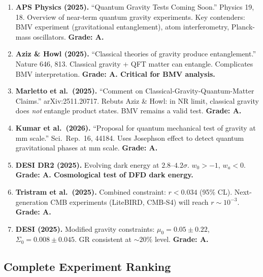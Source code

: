 \documentclass[11pt,a4paper]{article}
\begin{document}
\begin{enumerate}
\item \textbf{APS Physics (2025).} ``Quantum Gravity Tests Coming Soon.'' Physics 19, 18. Overview of near-term quantum gravity experiments. Key contenders: BMV experiment (gravitational entanglement), atom interferometry, Planck-mass oscillators. \textbf{Grade: A.}

\item \textbf{Aziz \& Howl (2025).} ``Classical theories of gravity produce entanglement.'' Nature 646, 813. Classical gravity + QFT matter can entangle. Complicates BMV interpretation. \textbf{Grade: A. Critical for BMV analysis.}

\item \textbf{Marletto et al.\ (2025).} ``Comment on Classical-Gravity-Quantum-Matter Claims.'' arXiv:2511.20717. Rebuts Aziz \& Howl: in NR limit, classical gravity does \emph{not} entangle product states. BMV remains a valid test. \textbf{Grade: A.}

\item \textbf{Kumar et al.\ (2026).} ``Proposal for quantum mechanical test of gravity at mm scale.'' Sci.\ Rep.\ 16, 44184. Uses Josephson effect to detect quantum gravitational phases at mm scale. \textbf{Grade: A.}

\item \textbf{DESI DR2 (2025).} Evolving dark energy at $2.8$--$4.2\sigma$. $w_0 > -1$, $w_a < 0$. \textbf{Grade: A. Cosmological test of DFD dark energy.}

\item \textbf{Tristram et al.\ (2025).} Combined constraint: $r < 0.034$ (95\% CL). Next-generation CMB experiments (LiteBIRD, CMB-S4) will reach $r \sim 10^{-3}$. \textbf{Grade: A.}

\item \textbf{DESI (2025).} Modified gravity constraints: $\mu_0 = 0.05 \pm 0.22$, $\Sigma_0 = 0.008 \pm 0.045$. GR consistent at $\sim 20\%$ level. \textbf{Grade: A.}
\end{enumerate}

\subsection{Complete Experiment Ranking}
\end{document}
